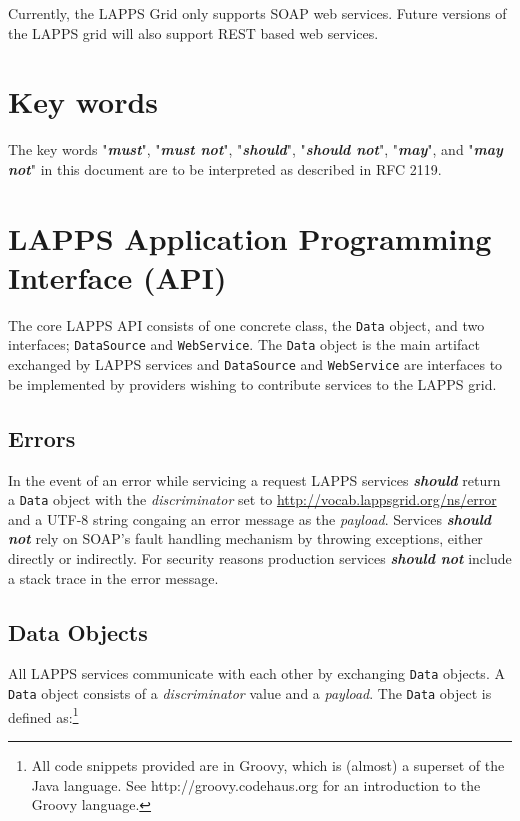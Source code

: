 \documentclass{article}
\newcommand{\lapps}{LAPPS\xspace}
\newcommand{\data}{\texttt{Data}\xspace}
\newcommand{\source}{\texttt{DataSource}\xspace}
\newcommand{\service}{\texttt{WebService}\xspace}
\newcommand{\discriminator}{\textit{discriminator}\xspace}
\newcommand{\payload}{\textit{payload}\xspace}
\newcommand{\ns}[1]{\url{http://vocab.lappsgrid.org/ns/#1}}
\newcommand{\definedterm}[1]{\textbf{\textit{#1}}\xspace}
\newcommand{\must}{\definedterm{must}}
\newcommand{\mustnot}{\definedterm{must not}}
\newcommand{\should}{\definedterm{should}}
\newcommand{\shouldnot}{\definedterm{should not}}
\newcommand{\may}{\definedterm{may}}
\newcommand{\maynot}{\definedterm{may not}}
\begin{document}
Currently, the \lapps Grid only supports SOAP\cite{soap} web services. Future versions of the \lapps grid will also support REST based web services.




\section{Key words}
The key words "\must", "\mustnot", "\should", "\shouldnot",  "\may", and "\maynot" in this document are to be interpreted as described in
      RFC 2119\cite{rfc2119}.



\section{LAPPS Application Programming Interface (API)}

The core  \lapps  API consists of one concrete class, the \data  object, and two interfaces; \source and \service.  The \data object is the main artifact exchanged by \lapps services and \source and \service are interfaces to be implemented by providers wishing to contribute services to the \lapps grid.  


\subsection{Errors}

In the event of an error while servicing a request \lapps services \should return a \data object with the \discriminator set to \ns{error} and a UTF-8 string congaing an error message as the \payload. Services \shouldnot rely on SOAP's fault handling mechanism by throwing exceptions, either directly or indirectly. For security reasons production services \shouldnot include a stack trace in the error message.


\subsection{Data Objects}
All \lapps services communicate with each other by exchanging \data objects.  A \data object consists of a \discriminator value and a \payload.  The \data object is defined as:\footnote{All code snippets provided are in Groovy, which is (almost) a superset of the Java language.  See http://groovy.codehaus.org for an introduction to the Groovy language.}
\end{document}
